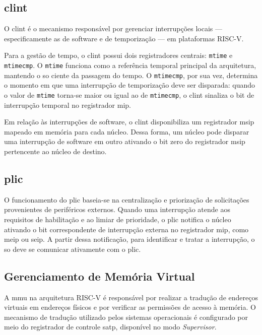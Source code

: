 \subsection{\gls{clint}}

O \gls{clint} é o mecanismo responsável por gerenciar interrupções locais — especificamente as de software e de temporização — em plataformas RISC-V.

Para a gestão de tempo, o \gls{clint} possui dois registradores centrais: \texttt{mtime} e \texttt{mtimecmp}. O \texttt{mtime} funciona como a referência temporal principal da arquitetura,
mantendo o \gls{so} ciente da passagem do tempo. O \texttt{mtimecmp}, por sua vez, determina o momento em que uma interrupção de temporização deve ser disparada:
quando o valor de \texttt{mtime} torna-se maior ou igual ao de \texttt{mtimecmp}, o \gls{clint} sinaliza o bit de interrupção temporal no registrador \gls{mip}.

Em relação às interrupções de software, o \gls{clint} disponibiliza um registrador \gls{msip} mapeado em memória para cada núcleo. Dessa forma, um núcleo pode disparar
uma interrupção de software em outro ativando o bit zero do registrador \gls{msip} pertencente ao núcleo de destino.

\subsection{\gls{plic}}

O funcionamento do \gls{plic} baseia-se na centralização e priorização de solicitações provenientes de periféricos externos. Quando uma interrupção atende aos requisitos
de habilitação e ao limiar de prioridade, o \gls{plic} notifica o núcleo ativando o bit correspondente de interrupção externa no registrador \gls{mip}, como \gls{meip} ou \gls{seip}.
A partir dessa notificação, para identificar e tratar a interrupção, o \gls{so} deve se comunicar ativamente com o \gls{plic}.

\subsection{Gerenciamento de Memória Virtual} 

A \gls{mmu} na arquitetura RISC-V é responsável por realizar a tradução de endereços virtuais em endereços físicos e por verificar as permissões de acesso à memória.
O mecanismo de tradução utilizado pelos sistemas operacionais é configurado por meio do registrador de controle \gls{satp}, disponível no modo \textit{Supervisor}.

